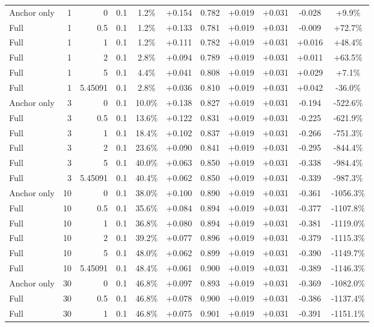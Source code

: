 \begin{table}[htbp]
\begin{tabular}{lrrrccccccc}
Anchor only & 1 & 0 & 0.1 & 1.2\% & +0.154 & 0.782 & +0.019 & +0.031 & -0.028 & +9.9\% \\
Full & 1 & 0.5 & 0.1 & 1.2\% & +0.133 & 0.781 & +0.019 & +0.031 & -0.009 & +72.7\% \\
Full & 1 & 1 & 0.1 & 1.2\% & +0.111 & 0.782 & +0.019 & +0.031 & +0.016 & +48.4\% \\
Full & 1 & 2 & 0.1 & 2.8\% & +0.094 & 0.789 & +0.019 & +0.031 & +0.011 & +63.5\% \\
Full & 1 & 5 & 0.1 & 4.4\% & +0.041 & 0.808 & +0.019 & +0.031 & +0.029 & +7.1\% \\
Full & 1 & 5.45091 & 0.1 & 2.8\% & +0.036 & 0.810 & +0.019 & +0.031 & +0.042 & -36.0\% \\
Anchor only & 3 & 0 & 0.1 & 10.0\% & +0.138 & 0.827 & +0.019 & +0.031 & -0.194 & -522.6\% \\
Full & 3 & 0.5 & 0.1 & 13.6\% & +0.122 & 0.831 & +0.019 & +0.031 & -0.225 & -621.9\% \\
Full & 3 & 1 & 0.1 & 18.4\% & +0.102 & 0.837 & +0.019 & +0.031 & -0.266 & -751.3\% \\
Full & 3 & 2 & 0.1 & 23.6\% & +0.090 & 0.841 & +0.019 & +0.031 & -0.295 & -844.4\% \\
Full & 3 & 5 & 0.1 & 40.0\% & +0.063 & 0.850 & +0.019 & +0.031 & -0.338 & -984.4\% \\
Full & 3 & 5.45091 & 0.1 & 40.4\% & +0.062 & 0.850 & +0.019 & +0.031 & -0.339 & -987.3\% \\
Anchor only & 10 & 0 & 0.1 & 38.0\% & +0.100 & 0.890 & +0.019 & +0.031 & -0.361 & -1056.3\% \\
Full & 10 & 0.5 & 0.1 & 35.6\% & +0.084 & 0.894 & +0.019 & +0.031 & -0.377 & -1107.8\% \\
Full & 10 & 1 & 0.1 & 36.8\% & +0.080 & 0.894 & +0.019 & +0.031 & -0.381 & -1119.0\% \\
Full & 10 & 2 & 0.1 & 39.2\% & +0.077 & 0.896 & +0.019 & +0.031 & -0.379 & -1115.3\% \\
Full & 10 & 5 & 0.1 & 48.0\% & +0.062 & 0.899 & +0.019 & +0.031 & -0.390 & -1149.7\% \\
Full & 10 & 5.45091 & 0.1 & 48.4\% & +0.061 & 0.900 & +0.019 & +0.031 & -0.389 & -1146.3\% \\
Anchor only & 30 & 0 & 0.1 & 46.8\% & +0.097 & 0.893 & +0.019 & +0.031 & -0.369 & -1082.0\% \\
Full & 30 & 0.5 & 0.1 & 46.8\% & +0.078 & 0.900 & +0.019 & +0.031 & -0.386 & -1137.4\% \\
Full & 30 & 1 & 0.1 & 46.8\% & +0.075 & 0.901 & +0.019 & +0.031 & -0.391 & -1151.1\% \\

\end{tabular}
\end{table}
